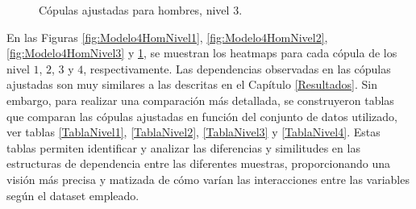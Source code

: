 \begin{figure}[H]
 \centering
    \caption{Cópulas ajustadas para hombres, nivel $3$.}
    \label{fig:Modelo4HomNivel4}
\end{figure}

En las Figuras \ref{fig:Modelo4HomNivel1}, \ref{fig:Modelo4HomNivel2}, \ref{fig:Modelo4HomNivel3} y \ref{fig:Modelo4HomNivel4}, se muestran los heatmaps para cada cópula de los nivel $1$, $2$, $3$ y $4$, respectivamente. Las dependencias observadas en las cópulas ajustadas son muy similares a las descritas en el Capítulo \ref{Resultados}. Sin embargo, para realizar una comparación más detallada, se construyeron tablas que comparan las cópulas ajustadas en función del conjunto de datos utilizado, ver tablas \ref{TablaNivel1}, \ref{TablaNivel2}, \ref{TablaNivel3} y \ref{TablaNivel4}. Estas tablas permiten identificar y analizar las diferencias y similitudes en las estructuras de dependencia entre las diferentes muestras, proporcionando una visión más precisa y matizada de cómo varían las interacciones entre las variables según el dataset empleado.

